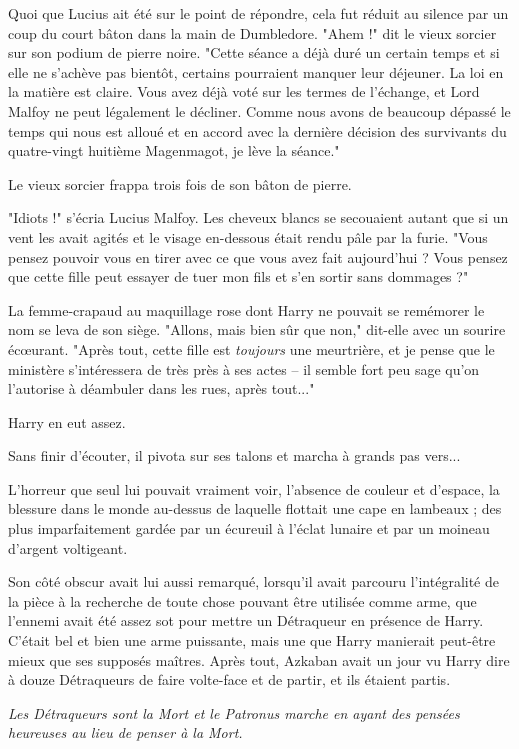 Quoi que Lucius ait été sur le point de répondre, cela fut réduit au silence par un coup du court bâton dans la main de Dumbledore. "Ahem !" dit le vieux sorcier sur son podium de pierre noire. "Cette séance a déjà duré un certain temps et si elle ne s'achève pas bientôt, certains pourraient manquer leur déjeuner. La loi en la matière est claire. Vous avez déjà voté sur les termes de l'échange, et Lord Malfoy ne peut légalement le décliner. Comme nous avons de beaucoup dépassé le temps qui nous est alloué et en accord avec la dernière décision des survivants du quatre-vingt huitième Magenmagot, je lève la séance."

Le vieux sorcier frappa trois fois de son bâton de pierre.

"Idiots !" s'écria Lucius Malfoy. Les cheveux blancs se secouaient autant que si un vent les avait agités et le visage en-dessous était rendu pâle par la furie. "Vous pensez pouvoir vous en tirer avec ce que vous avez fait aujourd'hui ? Vous pensez que cette fille peut essayer de tuer mon fils et s'en sortir sans dommages ?"

La femme-crapaud au maquillage rose dont Harry ne pouvait se remémorer le nom se leva de son siège. "Allons, mais bien sûr que non," dit-elle avec un sourire écœurant. "Après tout, cette fille est \emph{toujours}  une meurtrière, et je pense que le ministère s'intéressera de très près à ses actes – il semble fort peu sage qu'on l'autorise à déambuler dans les rues, après tout..."

Harry en eut assez.

Sans finir d'écouter, il pivota sur ses talons et marcha à grands pas vers...

L'horreur que seul lui pouvait vraiment voir, l'absence de couleur et d'espace, la blessure dans le monde au-dessus de laquelle flottait une cape en lambeaux ; des plus imparfaitement gardée par un écureuil à l'éclat lunaire et par un moineau d'argent voltigeant.

Son côté obscur avait lui aussi remarqué, lorsqu'il avait parcouru l'intégralité de la pièce à la recherche de toute chose pouvant être utilisée comme arme, que l'ennemi avait été assez sot pour mettre un Détraqueur en présence de Harry. C'était bel et bien une arme puissante, mais une que Harry manierait peut-être mieux que ses supposés maîtres. Après tout, Azkaban avait un jour vu Harry dire à douze Détraqueurs de faire volte-face et de partir, et ils étaient partis.

\emph{Les Détraqueurs sont la Mort et le Patronus marche en ayant des pensées heureuses au lieu de penser à la Mort.} 


